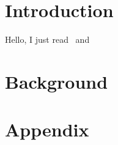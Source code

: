 \documentclass[a4paper,11pt]{report}
\begin{document}




\tableofcontents

\chapter{Introduction}

Hello, I just read~\cite{NIPS2017_6931} and~\cite{pmlr-v97-lee19d}

\chapter{Background}


\printnoidxglossaries

\chapter{Appendix}




\end{document}
